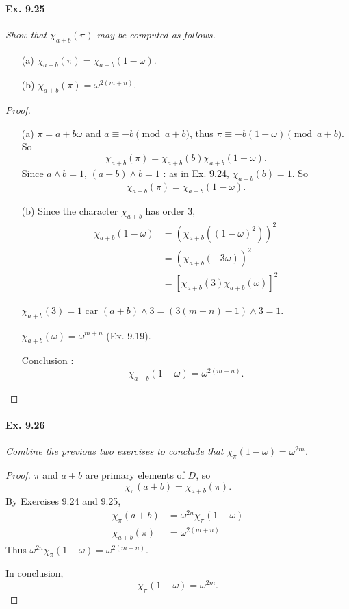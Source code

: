 \documentclass[11pt,a4paper]{article}
\begin{document}
\paragraph{Ex. 9.25}

{\it Show that $\chi_{a+b}(\pi)$ may be computed as follows.
\begin{enumerate}
\item[(a)] $\chi_{a+b}(\pi) = \chi_{a+b}(1-\omega)$.
\item[(b)] $\chi_{a+b}(\pi) = \omega^{2(m+n)}$.
\end{enumerate}
}

\begin{proof}
\begin{enumerate}
\item[(a)] $\pi = a + b \omega$ and $a \equiv -b \pmod {a+b}$, thus $\pi \equiv -b(1-\omega) \pmod {a+b}$. So
$$\chi_{a+b}(\pi) = \chi_{a+b}(b) \chi_{a+b}(1-\omega).$$
Since $a \wedge b = 1$, $(a+b) \wedge b = 1$ : as in Ex. 9.24, $\chi_{a+b}(b) = 1$. So
$$\chi_{a+b}(\pi) =  \chi_{a+b}(1-\omega).$$
\item[(b)] Since the character $\chi_{a+b}$ has order 3,
\begin{align*}
\chi_{a+b}(1-\omega) &= (\chi_{a+b}((1-\omega)^2))^2\\
&=(\chi_{a+b}(-3\omega))^2\\
&=[\chi_{a+b}(3) \chi_{a+b}(\omega)]^2
\end{align*}

$\chi_{a+b}(3) = 1$ car $(a+b) \wedge 3 = (3(m+n)-1) \wedge 3 = 1$.

$\chi_{a+b}(\omega) = \omega^{m+n}$ (Ex. 9.19).

Conclusion : $$\chi_{a+b}(1-\omega) = \omega^{2(m+n)}.$$
\end{enumerate}
\end{proof}

\paragraph{Ex. 9.26}

{\it Combine the previous two exercises to conclude that $\chi_\pi(1-\omega) = \omega^{2m}$.
}

\begin{proof}
$\pi$ and $a+b$ are primary elements of $D$, so
$$\chi_\pi(a+b) = \chi_{a+b}(\pi).$$
By Exercises 9.24 and 9.25,
\begin{align*}
\chi_\pi(a+b) &= \omega^{2n} \chi_\pi(1-\omega)\\
\chi_{a+b}(\pi) &= \omega^{2(m+n)}
\end{align*}
Thus $\omega^{2n} \chi_\pi(1-\omega) = \omega^{2(m+n)}$.

In conclusion,
$$\chi_\pi(1-\omega) = \omega^{2m}.$$
\end{proof}
\end{document}
